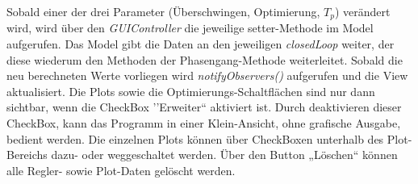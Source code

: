 Sobald einer der drei Parameter (\"Uberschwingen, Optimierung, $T_p$) ver\"andert wird, wird \"uber den \textit{GUIController} die jeweilige setter-Methode im Model aufgerufen. Das Model gibt die Daten an den jeweiligen \textit{closedLoop} weiter, der diese wiederum den Methoden der Phasengang-Methode weiterleitet. Sobald die neu berechneten Werte vorliegen wird \textit{notifyObservers()} aufgerufen und die View aktualisiert.
Die Plots sowie die Optimierungs-Schaltfl\"achen sind nur dann sichtbar, wenn die CheckBox ’’Erweiter“ aktiviert ist. Durch deaktivieren dieser CheckBox, kann das Programm in einer Klein-Ansicht, ohne grafische Ausgabe, bedient werden. Die einzelnen Plots k\"onnen \"uber CheckBoxen unterhalb des Plot-Bereichs dazu- oder weggeschaltet werden.
\"Uber den Button „L\"oschen“ k\"onnen alle Regler- sowie Plot-Daten gel\"oscht werden.
